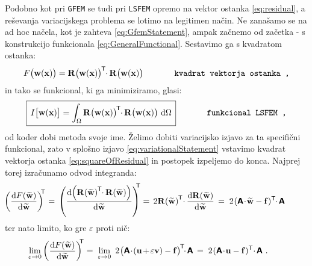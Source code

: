 Podobno kot pri \texttt{GFEM} se tudi pri \texttt{LSFEM} opremo na vektor ostanka \eqref{eq:residual}, a reševanja variacijskega problema se lotimo na legitimen način. Ne zanašamo se na ad hoc načela, kot je zahteva \eqref{eq:GfemStatement}, ampak začnemo od začetka - s konstrukcijo funkcionala \eqref{eq:GeneralFunctional}. Sestavimo ga s kvadratom ostanka:
\begin{equation}
	F\big(\mathbf{w(x)}\big)
	=
	\mathbf{R\big(w(x)\big)}^\mathsf{\mkern-1mu T} \mkern-5mu \cdot \mkern-1mu \mathbf{R\big(w(x)\big)} \hspace{1.3cm} \texttt{kvadrat vektorja ostanka ,}
	\label{eq:squareOfResidual}
\end{equation}
in tako se funkcional, ki ga minimiziramo, glasi:
\begin{equation}
	\boxed{
		\, I\big[\mathbf{w(x)}\big]
		=
		\int_{\Omega} \mathbf{R\big(w(x)\big)}^\mathsf{\mkern-2mu T} \mkern-5mu \cdot \mkern-1mu \mathbf{R\big(w(x)\big)} \ \mathrm{d} \Omega \,
	}
	\hspace{1.3cm} \texttt{funkcional LSFEM ,}
\end{equation}
od koder dobi metoda svoje ime. Želimo dobiti variacijsko izjavo za ta specifični funkcional, zato v splošno izjavo \eqref{eq:variationalStatement} vstavimo kvadrat vektorja ostanka \eqref{eq:squareOfResidual} in postopek izpeljemo do konca. Najprej torej izračunamo odvod integranda:
\begin{equation*}
	\hspace{-10mm}
	\left(\frac{\ud F(\widetilde{\mathbf{w}})}{\ud \widetilde{\mathbf{w}}}\right)^\mathsf{\mkern-7mu T}
	\mkern1mu = \,
	\left(\frac{\ud \! \left(\mathbf{R(\widetilde{w})}^\mathsf{\mkern-1mu T} \mkern-5mu \cdot \mkern-1mu \mathbf{R(\widetilde{w})}\right)}{\ud \mathbf{\widetilde{w}}}\right)^\mathsf{\mkern-10mu T}
	= \mkern3mu
	2 \mathbf{R(\widetilde{w})}^\mathsf{\mkern-1mu T} \mkern-4mu \cdot \mkern-1mu \frac{\ud \mathbf{R(\widetilde{w})}}{\ud \mathbf{\widetilde{w}}}
	\, = \mkern5mu
	2 \mkern1mu (\mathbsf{A} \! \cdot \! \mathbf{\widetilde{w}} - \mathbf{f})^\mathsf{T} \mkern-5mu \cdot \mkern-2mu \mathbsf{A}
\end{equation*}
ter nato limito, ko gre $\varepsilon$ proti nič:
\begin{equation*}
	\hspace{-7mm}
	\lim_{\varepsilon \rightarrow 0} \left(\frac{\ud F(\widetilde{\mathbf{w}})}{\ud \widetilde{\mathbf{w}}}\right)^\mathsf{\mkern-7mu T}
	=
	\mkern5mu \lim_{\varepsilon \rightarrow 0} \ 2 \mkern1mu \big(\mathbsf{A} \! \cdot \! (\mathbf{u} \mkern-2mu + \mkern-2mu \varepsilon \mathbf{v}) - \mathbf{f}\big)^\mathsf{\mkern-2mu T} \mkern-6mu \cdot \mkern-2mu \mathbsf{A}\,
	=
	\mkern5mu 2 \mkern1mu (\mathbsf{A} \! \cdot \! \mathbf{u} - \mathbf{f})^\mathsf{T} \mkern-4mu \cdot \mkern-2mu \mathbsf{A} \ .
\end{equation*}
